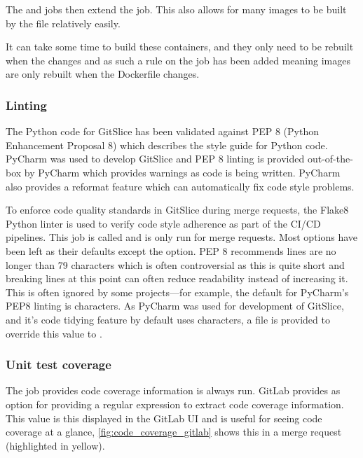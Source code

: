 \documentclass[11pt]{article}
\begin{document}
    The  and  jobs then extend the  job.
    This also allows for many images to be built by the  file relatively easily.
    
    It can take some time to build these containers, and they only need to be rebuilt when the  changes and as such a  rule on the  job has been added meaning images are only rebuilt when the Dockerfile changes.

    \subsubsection{Linting}
    \label{subsubsec:linting}

    The Python code for GitSlice has been validated against PEP 8 (Python Enhancement Proposal 8) which describes the style guide for Python code.
    PyCharm was used to develop GitSlice and PEP 8 linting is provided out-of-the-box by PyCharm which provides warnings as code is being written.
    PyCharm also provides a reformat feature which can automatically fix code style problems.

    To enforce code quality standards in GitSlice during merge requests, the Flake8 Python linter is used to verify code style adherence as part of the CI/CD pipelines.
    This job is called  and is only run for merge requests.
    Most options have been left as their defaults except the  option.
    PEP 8 recommends lines are no longer than 79 characters which is often controversial as this is quite short and breaking lines at this point can often reduce readability instead of increasing it.
    This is often ignored by some projects---for example, the default  for PyCharm's PEP8 linting is  characters.
    As PyCharm was used for development of GitSlice, and it's code tidying feature by default uses  characters, a  file is provided to override this value to .

    \subsubsection{Unit test coverage}
    \label{subsubsec:coverage}

    The  job provides code coverage information is always run.
    GitLab provides as  option for providing a regular expression to extract code coverage information.
    This value is this displayed in the GitLab UI and is useful for seeing code coverage at a glance, \autoref{fig:code_coverage_gitlab} shows this in a merge request (highlighted in yellow).
\end{document}

